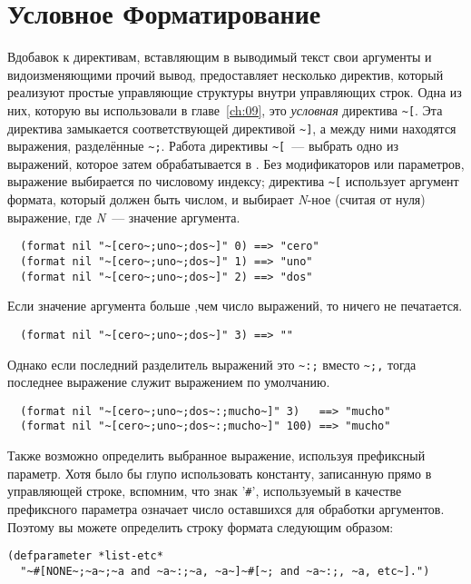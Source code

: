 \section{Условное Форматирование}

Вдобавок к директивам, вставляющим в выводимый текст свои аргументы и видоизменяющими
прочий вывод,  предоставляет несколько директив, который реализуют простые
управляющие структуры внутри управляющих строк. Одна из них, которую вы использовали в
главе~\ref{ch:09}, это \textit{условная} директива \lstinline!~[!. Эта директива
замыкается соответствующей директивой \lstinline!~]!, а между ними находятся выражения,
разделённые \lstinline!~;!. Работа директивы \lstinline!~[!~--- выбрать одно из выражений,
которое затем обрабатывается в . Без модификаторов или параметров, выражение
выбирается по числовому индексу; директива \lstinline!~[! использует аргумент формата,
который должен быть числом, и выбирает \textit{N}-ное (считая от нуля) выражение, где
\textit{N}~--- значение аргумента.

\begin{verbatim}
  (format nil "~[cero~;uno~;dos~]" 0) ==> "cero"
  (format nil "~[cero~;uno~;dos~]" 1) ==> "uno"
  (format nil "~[cero~;uno~;dos~]" 2) ==> "dos"
\end{verbatim}

Если значение аргумента больше ,чем число выражений, то ничего не печатается.

\begin{verbatim}
  (format nil "~[cero~;uno~;dos~]" 3) ==> ""
\end{verbatim}

Однако если последний разделитель выражений это \lstinline!~:;! вместо \lstinline!~;,!
тогда последнее выражение служит выражением по умолчанию.

\begin{verbatim}
  (format nil "~[cero~;uno~;dos~:;mucho~]" 3)   ==> "mucho"
  (format nil "~[cero~;uno~;dos~:;mucho~]" 100) ==> "mucho"
\end{verbatim}

Также возможно определить выбранное выражение, используя префиксный параметр. Хотя было бы
глупо использовать константу, записанную прямо в управляющей строке, вспомним, что знак
'\lstinline!#!', используемый в качестве префиксного параметра означает число оставшихся
для обработки аргументов. Поэтому вы можете определить строку формата следующим образом:

\begin{lstlisting}
(defparameter *list-etc*
  "~#[NONE~;~a~;~a and ~a~:;~a, ~a~]~#[~; and ~a~:;, ~a, etc~].")
\end{lstlisting}

